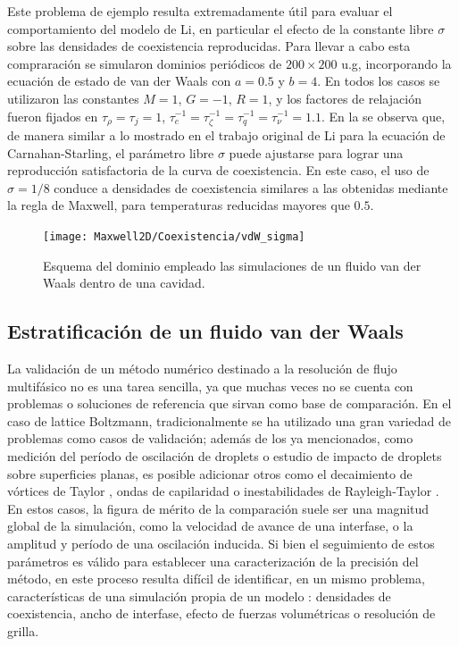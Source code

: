 Este problema de ejemplo resulta extremadamente \'util para evaluar el comportamiento del modelo de Li, en particular el efecto de la constante libre $\sigma$ sobre las densidades de coexistencia reproducidas. Para llevar a cabo esta compraraci\'on se simularon dominios peri\'odicos de $200\times 200$ u.g, incorporando la ecuaci\'on de estado de van der Waals con $a=0.5$ y $b=4$. En todos los casos se utilizaron las constantes $M=1$, $G=-1$, $R=1$, y los factores de relajaci\'on fueron fijados en $\tau_{\rho} = \tau_j=1$, $\tau_{e}^{-1}=\tau_{\zeta}^{-1}=\tau_{q}^{-1}=\tau_{\nu}^{-1}=1.1$. En la  se observa que, de manera similar a lo mostrado en el trabajo original de Li \cite{li_lattice_2013} para la ecuaci\'on de Carnahan-Starling, el par\'ametro libre $\sigma$ puede ajustarse para lograr una reproducci\'on satisfactoria de la curva de coexistencia. En este caso, el uso de $\sigma=1/8$ conduce a densidades de coexistencia similares a las obtenidas mediante la regla de Maxwell, para temperaturas reducidas mayores que $0.5$.

\begin{figure}[ht]
	\centering
	\texttt{[image: Maxwell2D/Coexistencia/vdW\_sigma]}
	\caption{Esquema del dominio empleado las simulaciones de un fluido van der Waals dentro de una cavidad.}
	\label{fig:maxwell_vdW}
\end{figure}





\subsection{Estratificaci\'on de un fluido van der Waals}

La validaci\'on de un m\'etodo num\'erico destinado a la resoluci\'on de flujo multif\'asico no es una tarea sencilla, ya que muchas veces no se cuenta con problemas o soluciones de referencia que sirvan como base de comparaci\'on. En el caso de lattice Boltzmann, tradicionalmente se ha utilizado una gran variedad de problemas como casos de validaci\'on; adem\'as de los ya mencionados, como medici\'on del per\'iodo de oscilaci\'on de droplets o estudio de impacto de droplets sobre superficies planas, es posible adicionar otros como el decaimiento de v\'ortices de Taylor \cite{guo_discrete_2002}, ondas de capilaridad \cite{mccracken_multiple-relaxation-time_2005} o inestabilidades de Rayleigh-Taylor \cite{li_additional_2012}. En estos casos, la figura de m\'erito de la comparaci\'on suele ser una magnitud global de la simulaci\'on, como la velocidad de avance de una interfase, o la amplitud y per\'iodo de una oscilaci\'on inducida. Si bien el seguimiento de estos par\'ametros es v\'alido para establecer una caracterizaci\'on de la precisi\'on del m\'etodo, en este proceso resulta dif\'icil de identificar, en un mismo problema, caracter\'isticas de una simulaci\'on propia de un modelo \pp{}: densidades de coexistencia, ancho de interfase, efecto de fuerzas volum\'etricas o resoluci\'on de grilla.

